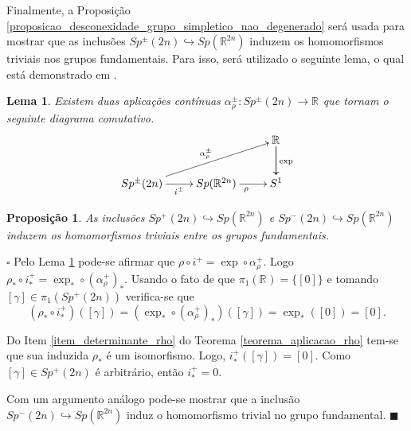 \documentclass[12pt]{book}
\newtheorem{lema}[teorema]{Lema}
\newtheorem{proposicao}[teorema]{Proposição}
\newenvironment{prova}[1]{$\square$ #1}{\hfill$\blacksquare$}
\newcommand{\classe}[1]{[#1]}
\newcommand{\grupofundamental}[1]{\pi_{1}(#1)}
\newcommand{\gruposimpletico}[1]{Sp(#1)}
\newcommand{\gruposimpleticonaodegenerado}[1]{Sp^{#1}(2n)}
\newcommand{\real}[1]{\mathbb{R}^{#1}}
\newcommand{\reta}{\real{}}
\begin{document}
	Finalmente, a Proposição \ref{proposicao_desconexidade_grupo_simpletico_nao_degenerado} será usada para mostrar que as inclusões $\gruposimpleticonaodegenerado{\pm} \hookrightarrow \gruposimpletico{\real{2n}}$ induzem os homomorfismos triviais nos grupos fundamentais. Para isso, será utilizado o seguinte lema, o qual está demonstrado em \cite{audi_floer_homology}.
	
	\begin{lema}\label{lema_levantamento_rho}
		Existem duas aplicações contínuas $\alpha^{\pm}_{\rho}: \gruposimpleticonaodegenerado{\pm}\to \reta$ que tornam o seguinte diagrama comutativo.
		$$
		\xymatrix{
			& & \real{}\ar[d]\ar[d]^{\text{exp}}
			\\
			\gruposimpleticonaodegenerado{\pm}\ar[urr]^{\alpha^{\pm}_{\rho}} \ar[r]_{i^{\pm}} & \gruposimpletico{\real{2n}} \ar[r]_{\rho} & S^{1}
		}
		$$	
		
	\end{lema}
	
	\begin{proposicao}\label{proposicao_homomorfismo_trivial_grupos_simpletico}
		As inclusões $\gruposimpleticonaodegenerado{+} \hookrightarrow \gruposimpletico{\real{2n}}$ e $\gruposimpleticonaodegenerado{-} \hookrightarrow \gruposimpletico{\real{2n}}$ induzem os homomorfismos triviais entre os grupos fundamentais.
	\end{proposicao}
	\begin{prova}
		Pelo Lema \ref{lema_levantamento_rho} pode-se afirmar que $\rho\circ i^{+} = \exp\circ \alpha^{+}_{\rho}$. Logo $\rho_{*}\circ i^{+}_{*} = \exp_{*}\circ (\alpha^{+}_{\rho})_{*}$. Usando o fato de que $\grupofundamental{\reta}=\{\classe{0}\}$ e tomando $\classe{\gamma}\in \grupofundamental{\gruposimpleticonaodegenerado{+}}$ verifica-se que 
		$$
		(\rho_{*}\circ i^{+}_{*})(\classe{\gamma}) = (\exp_{*}\circ (\alpha^{+}_{\rho})_{*})(\classe{\gamma}) = \exp_{*}(\classe{0})=\classe{0}.
		$$
		
		Do Item \ref{item_determinante_rho} do Teorema \ref{teorema_aplicacao_rho} tem-se que sua induzida $\rho_{*}$ é um isomorfismo. Logo, $	i^{+}_{*}(\classe{\gamma})=\classe{0}$. Como $\classe{\gamma}\in \gruposimpleticonaodegenerado{+}$ é arbitrário, então $i^{+}_{*} = 0$.
		
		Com um argumento análogo pode-se mostrar que a inclusão $\gruposimpleticonaodegenerado{-}\hookrightarrow \gruposimpletico{\real{2n}}$ induz o homomorfismo trivial no grupo fundamental.
	\end{prova}
		
\end{document}
